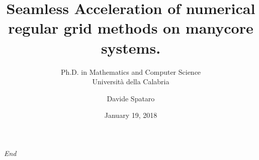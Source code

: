 \documentclass{beamer}
\begin{document}
\title{Seamless Acceleration of numerical regular grid methods on manycore systems.}
\subtitle{Ph.D. in Mathematics and Computer Science\\ Universit\`a della Calabria}
\author{Davide Spataro} 
\date{January 19, 2018}

\frame{\titlepage} 












%


\begin{frame}{}
\centering \Huge
\emph{End}
\end{frame}
\end{document}
